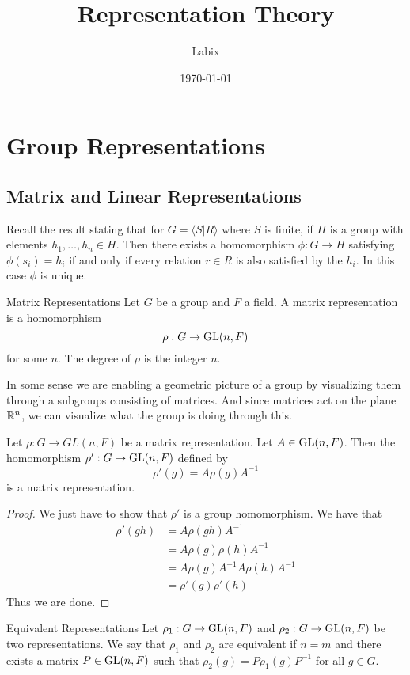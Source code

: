 \documentclass[a4paper]{article}
\title{Representation Theory}
\author{Labix}
\date{\today}
\begin{document}
\maketitle
\begin{abstract}
\end{abstract}
\pagebreak
\tableofcontents
\pagebreak

\pagebreak
\section{Group Representations}
\subsection{Matrix and Linear Representations}
Recall the result stating that for $G=\langle S|R\rangle$ where $S$ is finite, if $H$ is a group with elements $h_1,\dots,h_n\in H$. Then there exists a homomorphism $\phi:G\to H$ satisfying $\phi(s_i)=h_i$ if and only if every relation $r\in R$ is also satisfied by the $h_i$. In this case $\phi$ is unique. 

\begin{defn}{Matrix Representations}{} Let $G$ be a group and $F$ a field. A matrix representation is a homomorphism $$\rho:G\to\operatorname{GL}(n,F)$$ for some $n$. The degree of $\rho$ is the integer $n$. 
\end{defn}

In some sense we are enabling a geometric picture of a group by visualizing them through a subgroups consisting of matrices. And since matrices act on the plane $\mathbb{R}^n$, we can visualize what the group is doing through this. 

\begin{lmm}{}{} Let $\rho:G\to GL(n,F)$ be a matrix representation. Let $A\in\operatorname{GL}(n,F)$. Then the homomorphism $\rho':G\to\operatorname{GL}(n,F)$ defined by $$\rho'(g)=A\rho(g)A^{-1}$$ is a matrix representation. \tcbline
\begin{proof}
We just have to show that $\rho'$ is a group homomorphism. We have that 
\begin{align*}
\rho'(gh)&=A\rho(gh)A^{-1}\\
&=A\rho(g)\rho(h)A^{-1}\\
&=A\rho(g)A^{-1}A\rho(h)A^{-1}\\
&=\rho'(g)\rho'(h)
\end{align*}
Thus we are done. 
\end{proof}
\end{lmm}

\begin{defn}{Equivalent Representations}{} Let $\rho_1:G\to\operatorname{GL}(n,F)$ and $\rho_2:G\to\operatorname{GL}(n,F)$ be two representations. We say that $\rho_1$ and $\rho_2$ are equivalent if $n=m$ and there exists a matrix $P\in\operatorname{GL}(n,F)$ such that $\rho_2(g)=P\rho_1(g)P^{-1}$ for all $g\in G$. 
\end{defn}
\end{document}
